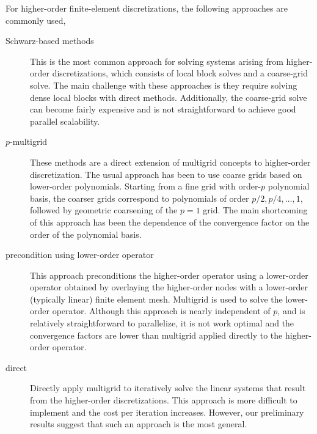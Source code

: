 \documentclass{report}
\begin{document}
For higher-order finite-element discretizations, the following approaches
are commonly used,
\begin{description}
\item[Schwarz-based methods] This is the most common approach for
solving systems arising from higher-order discretizations, which
consists of local block solves and a coarse-grid solve. The main
challenge with these approaches is they require solving dense local
blocks with direct methods. Additionally, the coarse-grid solve can
become fairly expensive and is not straightforward to achieve good
parallel scalability.
\item[$p$-multigrid] These methods are a direct extension of
multigrid concepts to higher-order discretization. The usual
approach has been to use coarse grids based on lower-order
polynomials. Starting from a fine grid with order-$p$ polynomial
basis, the coarser grids correspond to polynomials of order $p/2,
p/4,\ldots,1$, followed by geometric coarsening of the $p=1$
grid. The main shortcoming of this approach has been the dependence
of the convergence factor on the order of the polynomial
basis.
\item[precondition using lower-order operator] This
approach preconditions the higher-order operator using a lower-order
operator obtained by overlaying the higher-order nodes with a
lower-order (typically linear) finite element mesh. Multigrid is
used to solve the lower-order operator. Although this approach is
nearly independent of $p$, and is relatively straightforward to
parallelize, it is not work optimal and the convergence factors are
lower than multigrid applied directly to the higher-order
operator.
\item[direct] Directly apply multigrid to iteratively
solve the linear systems that result from the higher-order
discretizations. This approach is more difficult to implement and
the cost per iteration increases. However, our preliminary results
suggest that such an approach is the most general.
\end{description}
\end{document}
